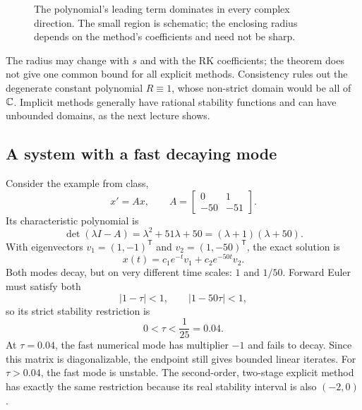 \begin{figure}[htbp]
\centering
{}
\caption{The polynomial's leading term dominates in every complex
direction. The small region is schematic; the enclosing radius depends
on the method's coefficients and need not be sharp.}
\end{figure}

\begin{remark}
 The radius may change with \(s\) and with the RK coefficients; the
 theorem does not give one common bound for all explicit methods.
 Consistency rules out the degenerate constant polynomial \(R\equiv1\),
 whose non-strict domain would be all of \(\mathbb{C}\).
 Implicit methods generally have rational stability functions and can
 have unbounded domains, as the next lecture shows.
\end{remark}

\subsection{A system with a fast decaying mode}

Consider the example from class,
\begin{equation}\label{eq:stiff-matrix-sep-16}
 x'=Ax,\qquad
 A=\begin{bmatrix}0&1\\-50&-51\end{bmatrix}.
\end{equation}
Its characteristic polynomial is
\[
 \det(\lambda I-A)=\lambda^2+51\lambda+50
       =(\lambda+1)(\lambda+50).
\]
With eigenvectors \(v_1=(1,-1)^{\mathsf T}\) and
\(v_2=(1,-50)^{\mathsf T}\), the exact solution is
\[
 x(t)=c_1e^{-t}v_1+c_2e^{-50t}v_2.
\]
Both modes decay, but on very different time scales: \(1\) and
\(1/50\). Forward Euler must satisfy both
\[
 |1-\tau|<1,\qquad |1-50\tau|<1,
\]
so its strict stability restriction is
\begin{equation}\label{eq:stiff-step-bound-sep-16}
 \boxed{0<\tau<\frac1{25}=0.04.}
\end{equation}
At \(\tau=0.04\), the fast numerical mode has multiplier \(-1\)
and fails to decay. Since this matrix is diagonalizable, the endpoint
still gives bounded linear iterates. For \(\tau>0.04\), the fast mode
is unstable. The second-order, two-stage explicit method has exactly
the same restriction because its real stability interval is also
\((-2,0)\).


